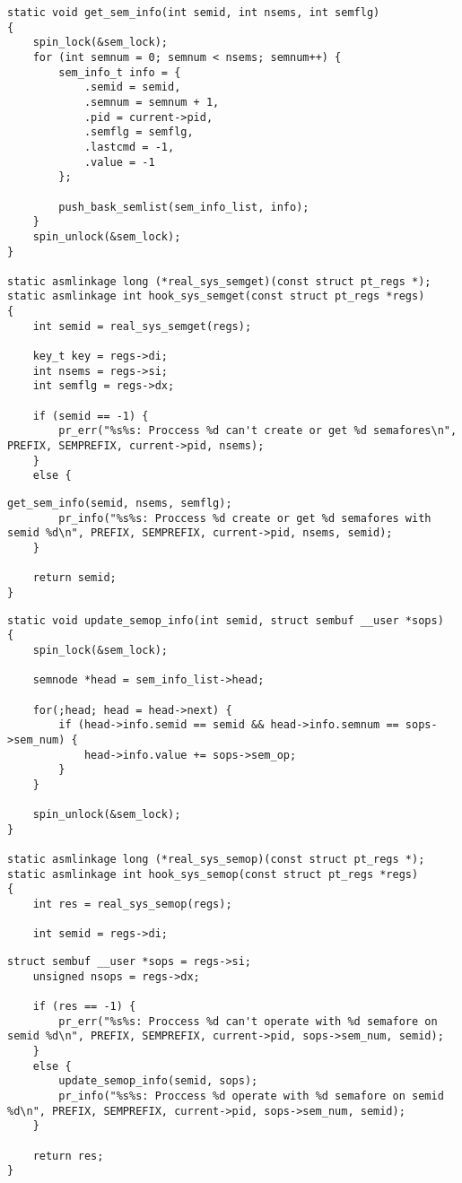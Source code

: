 \begin{lstlisting}[label=lst:sys_semget,caption=Реализация функции обертки \texttt{sys\_semget()}]	
static void get_sem_info(int semid, int nsems, int semflg)
{
	spin_lock(&sem_lock);
	for (int semnum = 0; semnum < nsems; semnum++) {
		sem_info_t info = {
			.semid = semid,
			.semnum = semnum + 1,
			.pid = current->pid,
			.semflg = semflg,
			.lastcmd = -1,
			.value = -1
		};
		
		push_bask_semlist(sem_info_list, info);
	}
	spin_unlock(&sem_lock);
}

static asmlinkage long (*real_sys_semget)(const struct pt_regs *);
static asmlinkage int hook_sys_semget(const struct pt_regs *regs)
{
	int semid = real_sys_semget(regs);
	
	key_t key = regs->di;
	int nsems = regs->si;
	int semflg = regs->dx;
	
	if (semid == -1) {
		pr_err("%s%s: Proccess %d can't create or get %d semafores\n", PREFIX, SEMPREFIX, current->pid, nsems);
	}
	else {
\end{lstlisting}		
\begin{lstlisting}[label=lst:sys_semget-2,caption=Реализация функции обертки \texttt{sys\_semget()}]
		get_sem_info(semid, nsems, semflg);
		pr_info("%s%s: Proccess %d create or get %d semafores with semid %d\n", PREFIX, SEMPREFIX, current->pid, nsems, semid);
	}
	
	return semid;
}
\end{lstlisting}


\begin{lstlisting}[label=lst:sys_semop,caption=Реализация функции обертки \texttt{sys\_semop()}]	
static void update_semop_info(int semid, struct sembuf __user *sops)
{
	spin_lock(&sem_lock);
	
	semnode *head = sem_info_list->head;
	
	for(;head; head = head->next) {
		if (head->info.semid == semid && head->info.semnum == sops->sem_num) {
			head->info.value += sops->sem_op;
		} 
	}
	
	spin_unlock(&sem_lock);
}

static asmlinkage long (*real_sys_semop)(const struct pt_regs *);
static asmlinkage int hook_sys_semop(const struct pt_regs *regs)
{
	int res = real_sys_semop(regs);
	
	int semid = regs->di;
\end{lstlisting}	
\begin{lstlisting}[label=lst:sys_semop-2,caption=Реализация функции обертки \texttt{sys\_semop()}]	
	struct sembuf __user *sops = regs->si;
	unsigned nsops = regs->dx;
		
	if (res == -1) {
		pr_err("%s%s: Proccess %d can't operate with %d semafore on semid %d\n", PREFIX, SEMPREFIX, current->pid, sops->sem_num, semid);
	}
	else {
		update_semop_info(semid, sops);
		pr_info("%s%s: Proccess %d operate with %d semafore on semid %d\n", PREFIX, SEMPREFIX, current->pid, sops->sem_num, semid);
	}
	
	return res;
}
\end{lstlisting}


